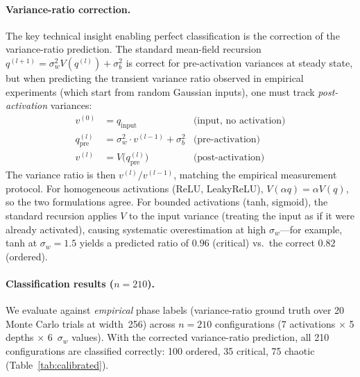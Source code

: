 \documentclass[10pt]{article}
\begin{document}
\paragraph{Variance-ratio correction.}
The key technical insight enabling perfect classification is the correction of the variance-ratio prediction.
The standard mean-field recursion $q^{(l+1)} = \sigma_w^2 V(q^{(l)}) + \sigma_b^2$ is correct for pre-activation variances at steady state, but when predicting the transient variance ratio observed in empirical experiments (which start from random Gaussian inputs), one must track \emph{post-activation} variances:
\begin{align}
    v^{(0)} &= q_{\mathrm{input}} & \text{(input, no activation)} \label{eq:post-act-init} \\
    q^{(l)}_{\mathrm{pre}} &= \sigma_w^2 \cdot v^{(l-1)} + \sigma_b^2 & \text{(pre-activation)} \label{eq:post-act-pre} \\
    v^{(l)} &= V\!\bigl(q^{(l)}_{\mathrm{pre}}\bigr) & \text{(post-activation)} \label{eq:post-act-post}
\end{align}
The variance ratio is then $v^{(l)}/v^{(l-1)}$, matching the empirical measurement protocol.
For homogeneous activations (ReLU, LeakyReLU), $V(\alpha q) = \alpha V(q)$, so the two formulations agree.
For bounded activations (tanh, sigmoid), the standard recursion applies $V$ to the input variance (treating the input as if it were already activated), causing systematic overestimation at high $\sigma_w$---for example, tanh at $\sigma_w = 1.5$ yields a predicted ratio of $0.96$ (critical) vs.\ the correct $0.82$ (ordered).

\paragraph{Classification results ($n=210$).}
We evaluate against \emph{empirical} phase labels (variance-ratio ground truth over 20 Monte Carlo trials at width~256) across $n=210$ configurations (7 activations $\times$ 5 depths $\times$ 6~$\sigma_w$ values).
With the corrected variance-ratio prediction, all 210 configurations are classified correctly: 100 ordered, 35 critical, 75 chaotic (Table~\ref{tab:calibrated}).
\end{document}
